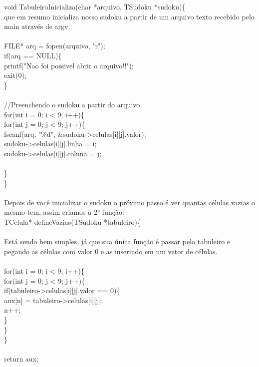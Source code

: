 \documentclass{article}
\begin{document}
void TabuleiroInicializa(char *arquivo, TSudoku *sudoku)\{\\
que em resumo inicializa nosso sudoku a partir de um arquivo texto recebido pelo main através de argv.\\
\\
FILE* arq = fopen(arquivo, "r");\\
    if(arq == NULL)\{\\
        printf("Nao foi possivel abrir o arquivo!!");\\
        exit(0);\\
    \}\\
 \\
    //Preenchendo o sudoku a partir do arquivo\\
    for(int i = 0; i < 9; i++)\{\\
        for(int j = 0; j < 9; j++)\{\\
            fscanf(arq, "\%d", \&sudoku->celulas[i][j].valor);\\
            sudoku->celulas[i][j].linha = i;\\
            sudoku->celulas[i][j].coluna = j;\\
 \\
       \}\\
    \}
\\\\Depois de você inicializar o sudoku o próximo passo é ver quantas células vazias o mesmo tem, assim criamos a 2° função:\\
TCelula* defineVazias(TSudoku *tabuleiro)\{\\
\\
Está sendo bem simples, já que sua única função é passar pelo tabuleiro e pegando as células com valor 0 e as inserindo em um vetor de células.
\\\\for(int i = 0; i < 9; i++)\{\\
        for(int j = 0; j < 9; j++)\{\\
            if(tabuleiro->celulas[i][j].valor == 0)\{\\
                aux[n] = tabuleiro->celulas[i][j];\\
                n++;\\
            \}\\
        \}\\
    \}\\
 \\
    return aux;\\\\
\end{document}
